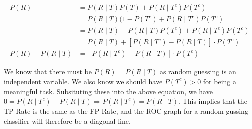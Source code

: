 \documentclass[12pt]{article}
\begin{document}
\begin{align*}
    P(R) &= P(R \mid T)P(T) + P(R \mid T^c) P(T^c) \\
    &= P(R \mid T)(1 - P(T^c) + P(R \mid T^c) P(T^c) \\
    &= P(R \mid T) - P(R \mid T)P(T^c)+ P(R \mid T^c) P(T^c) \\
    &= P(R \mid T) + [P(R \mid T^c) -  P(R \mid T)] \cdot P(T^c) \\
    P(R) - P(R \mid T) &= [P(R \mid T^c) -  P(R \mid T)] \cdot P(T^c)
\end{align*}

We know that there must be $P(R) = P(R \mid T)$ as random guessing is an independent variable. We also know we should have $P(T^c) > 0$ for being a meaningful task. Subsituting these into the above equation, we have $0 = P(R \mid T^c) -  P(R \mid T) \Longrightarrow  P(R \mid T^c) = P(R \mid T)$. This implies that the TP Rate is the same as the FP Rate, and the ROC graph for a random gussing classifier will therefore be a diagonal line.


% 
% 
\end{document}
